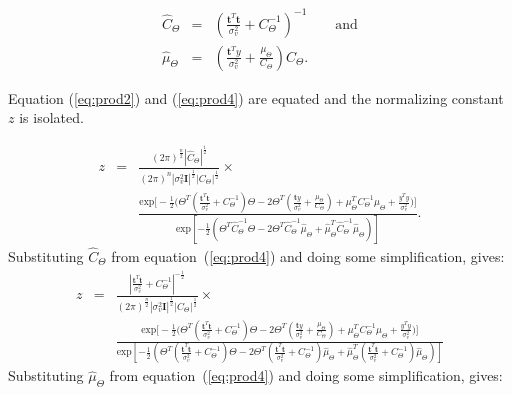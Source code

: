 \begin{eqnarray}
\label{eq:prod4}
\hat{C}_\Theta &=& \left(\frac{\textbf{t}^T\textbf{t}}{\sigma_v^2} + C_\Theta^{-1}\right)^{-1} \qquad \textrm{and}\\\nonumber
\hat{\mu}_\Theta &=& \left(\frac{\textbf{t}^Ty}{\sigma_v^2} + \frac{\mu_\Theta}{C_\Theta}\right)\hat{C}_\Theta.
\end{eqnarray}

Equation (\ref{eq:prod2}) and (\ref{eq:prod4}) are equated and the normalizing constant $z$ is isolated.

{\setlength\arraycolsep{2pt}
\begin{eqnarray}\label{eq:z1}
z &=& \frac{(2\pi)^{\frac{n}{2}}\left|\hat{C}_\Theta\right|^{\frac{1}{2}} }{(2\pi)^n |\sigma_v^2\textbf{I}|^{\frac{1}{2}} |C_\Theta|^{\frac{1}{2}}} \times {}\\\nonumber
& &\frac{\textrm{exp}\Bigg[-\frac{1}{2}\Bigg(\Theta^T\left(\frac{\textbf{t}^T\textbf{t}}{\sigma_v^2} + C_\Theta^{-1}\right)\Theta - 2 \Theta^T\left(\frac{\textbf{t}y}{\sigma_v^2} + \frac{\mu_\Theta}{C_\Theta}\right) + \mu_\Theta^TC_\Theta^{-1}\mu_\Theta + \frac{y^Ty}{\sigma_v^2}\Bigg)\Bigg]}{\textrm{exp}\left[-\frac{1}{2}\left(\Theta^T\hat{C}_\Theta^{-1}\Theta - 2\Theta^T\hat{C}_\Theta^{-1}\hat{\mu}_\Theta + \hat{\mu}_\Theta^T\hat{C}_\Theta^{-1}\hat{\mu}_\Theta \right)\right]}.
\end{eqnarray}}
Substituting $\hat{C}_\Theta$ from equation~(\ref{eq:prod4}) and doing some simplification, gives:
{\setlength\arraycolsep{2pt}
\begin{eqnarray}\label{eq:z2}
z &=& \frac{\left|\frac{\textbf{t}^T\textbf{t}}{\sigma_v^2} + C_\Theta^{-1}\right|^{-\frac{1}{2}}}{(2\pi)^{\frac{n}{2}} |\sigma_v^2\textbf{I}|^{\frac{1}{2}} |C_\Theta|^{\frac{1}{2}}} \times {}\\\nonumber
& &\frac{\textrm{exp}\Bigg[-\frac{1}{2}\Bigg(\Theta^T\left(\frac{\textbf{t}^T\textbf{t}}{\sigma_v^2} + C_\Theta^{-1}\right)\Theta - 2 \Theta^T\left(\frac{\textbf{t}y}{\sigma_v^2} + \frac{\mu_\Theta}{C_\Theta}\right) +  \mu_\Theta^TC_\Theta^{-1}\mu_\Theta + \frac{y^Ty}{\sigma_v^2}\Bigg)\Bigg]}{\textrm{exp}\left[-\frac{1}{2}\left(\Theta^T \left(\frac{\textbf{t}^T\textbf{t}}{\sigma_v^2} + C_\Theta^{-1}\right)\Theta  - 2\Theta^T\left(\frac{\textbf{t}^T\textbf{t}}{\sigma_v^2} + C_\Theta^{-1}\right)\hat{\mu}_\Theta  + \hat{\mu}_\Theta^T\left(\frac{\textbf{t}^T\textbf{t}}{\sigma_v^2} + C_\Theta^{-1}\right)\hat{\mu}_\Theta \right)\right]}
\end{eqnarray}}
Substituting $\hat{\mu}_\Theta$ from equation~(\ref{eq:prod4}) and doing some simplification, gives:
